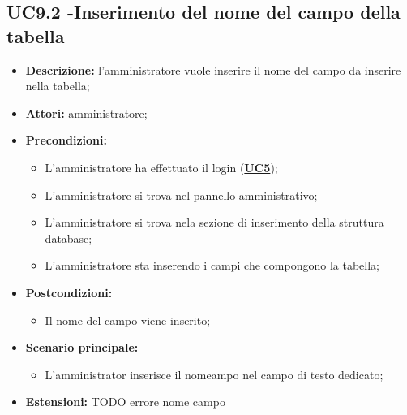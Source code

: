 \documentclass[5pt]{article}
\begin{document}
\subsection{UC9.2 -Inserimento del nome del campo della tabella}
\label{sec:UC9.2}
\begin{itemize}
	\item \textbf{Descrizione:} l’amministratore vuole inserire il nome del campo da inserire nella tabella;
	\item \textbf{Attori:} amministratore;
	\item \textbf{Precondizioni:} 
	\begin{itemize}
		\item L’amministratore ha effettuato il login (\hyperref[sec:UC5]{\textbf{UC5}});
		\item L’amministratore si trova nel pannello amministrativo;
		\item L’amministratore si trova nela sezione di inserimento della struttura database;
		\item L’amministratore sta inserendo i campi che compongono la tabella;
	\end{itemize}
	\item \textbf{Postcondizioni:} 
	\begin{itemize}
		\item Il nome del campo viene inserito;
	\end{itemize}
	\item \textbf{Scenario principale:} 
	\begin{itemize}
		\item L’amministrator inserisce il nomeampo nel campo di testo dedicato;
	\end{itemize}
	\item \textbf{Estensioni:} TODO errore nome campo
\end{itemize}

\iffalse
\end{document}
